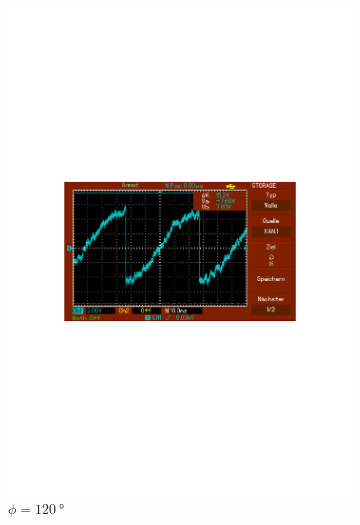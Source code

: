 \begin{figure}
\begin{subfigure}{0.3\textwidth}
      \includegraphics[width=\textwidth]{Daten/Noise/120.pdf}
      \caption{$\phi = \SI{120}{\degree}$}
      \label{fig:120n}
  \end{subfigure}
  \begin{subfigure}{0.3\textwidth}
      \centering

\end{subfigure}
\end{figure}
